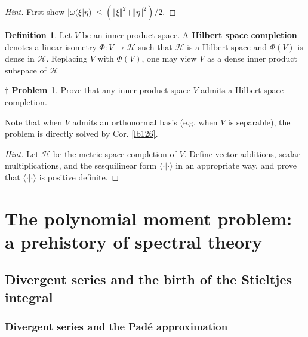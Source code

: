 \documentclass[12pt,b5paper,notitlepage]{article}
\theoremstyle{definition}
\newtheorem{df}{Definition}[subsection]
\newtheorem{dprob}[prob]{\color{red}$\dagger$ Problem}
\theoremstyle{plain}
\newcommand{\bk}[1]{\langle {#1}\rangle}
\newcommand{\MH}{\mathcal H}
\numberwithin{equation}{section}
\begin{document}
\begin{proof}[Hint]
First show $|\omega(\xi|\eta)|\leq (\Vert\xi\Vert^2+\Vert\eta\Vert^2)/2$.
\end{proof}



\begin{df}
Let $V$ be an inner product space. A \textbf{Hilbert space completion}  denotes a linear isometry $\Phi:V\rightarrow\MH$ such that $\MH$ is a Hilbert space and $\Phi(V)$ is dense in $\MH$. Replacing $V$ with $\Phi(V)$, one may view $V$ as a dense inner product subspace of $\MH$
\end{df}


\begin{dprob}\label{lb350}
Prove that any inner product space $V$ admits a Hilbert space completion.
\end{dprob}

Note that when $V$ admits an orthonormal basis (e.g. when $V$ is separable), the problem is directly solved by Cor. \ref{lb126}.

\begin{proof}[Hint]
Let $\MH$ be the metric space completion of $V$. Define vector additions, scalar multiplications, and the sesquilinear form $\bk{\cdot|\cdot}$ in an appropriate way, and prove that $\bk{\cdot|\cdot}$ is positive definite. 
\end{proof}









\newpage



\section{The polynomial moment problem: a prehistory of spectral theory}\label{lb114}


\subsection{Divergent series and the birth of the Stieltjes integral}\label{lb182}


\subsubsection{Divergent series and the Pad\'e approximation}
\end{document}
